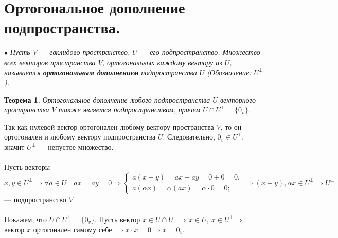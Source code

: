 \section{Ортогональное дополнение подпространства.}
$\bullet$ \textit{Пусть $V$ --- евклидово пространство, $U$ --- его подпространство. Множество всех векторов пространства $V$, ортогональных каждому вектору из $U$, называется \textbf{ортогональным дополнением} подпространства $U$ (Обозначение: $U^\perp$).}
\newtheorem*{th14_4_1}{Теорема}\begin{th14_4_1}Ортогональное дополнение любого подпространства $U$ векторного пространства $V$ также является подпространством, причем $U \cap U^{\perp}=\{0_v\}$.
\end{th14_4_1}\begin{Proof}
	Так как нулевой вектор ортогонален любому вектору пространства $V$, то он ортогонален и любому вектору подпространства $U$. Следовательно, $0_v\in U^\perp$, значит $U^\perp$ --- непустое множество.\\\\
	Пусть векторы $x,y\in U^\perp \Rightarrow \forall a\in U\quad ax = ay = 0\Rightarrow\begin{cases}
		a(x+y) = ax + ay = 0 + 0 = 0,\\
		a(\alpha x) = \alpha(ax) = \alpha\cdot 0 = 0;
	\end{cases}\Rightarrow (x+y), \alpha x\in U^\perp \Rightarrow U^\perp$ --- подпространство $V$.\\\\
	Покажем, что $U \cap U^{\perp}=\{0_v\}$. Пусть вектор $x\in U\cap U^\perp\Rightarrow x\in U,\ x\in U^\perp\Rightarrow$ вектор $x$ ортогонален самому себе $\Rightarrow x\cdot x = 0 \Rightarrow x = 0_v$.
\end{Proof}
